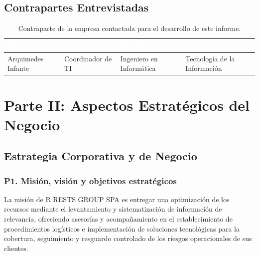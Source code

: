 \documentclass[12pt]{article}
\begin{document}
\subsection{Contrapartes Entrevistadas}

\begin{table}[H]
\centering
\renewcommand{\arraystretch}{1.4}
\begin{tabularx}{\textwidth}{>{\centering\arraybackslash}p{3.2cm} >{\centering\arraybackslash}p{4cm} >{\centering\arraybackslash}p{3.5cm} >{\centering\arraybackslash}X}
\toprule
\rowcolor{headerblue}
\textcolor{white}{\textbf{Nombre}} &
\textcolor{white}{\textbf{Cargo}} &
\textcolor{white}{\textbf{Profesi\'on}} &
\textcolor{white}{\textbf{\'Area}} \\
\midrule
Arquimedes Infante & Coordinador de TI & Ingeniero en Inform\'atica & Tecnolog\'ia de la Informaci\'on \\
\bottomrule
\end{tabularx}
\caption{Contraparte de la empresa contactada para el desarrollo de este informe.}
\end{table}

\newpage

\section{Parte II: Aspectos Estrat\'egicos del Negocio}

\subsection{Estrategia Corporativa y de Negocio}

\subsubsection*{\textbf{P1. Misi\'on, visi\'on y objetivos estrat\'egicos}}

La misi\'on de R RESTS GROUP SPA es entregar una optimizaci\'on de los recursos mediante
el levantamiento y sistematizaci\'on de informaci\'on de relevancia, ofreciendo asesor\'ias
y acompa\~namiento en el establecimiento de procedimientos log\'isticos e implementaci\'on
de soluciones tecnol\'ogicas para la cobertura, seguimiento y resguardo controlado de los riesgos operacionales de sus clientes.
\end{document}
